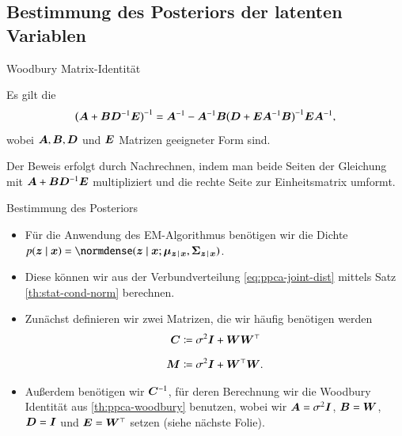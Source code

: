 \subsection{Bestimmung des Posteriors der latenten Variablen}

\begin{frame}{Woodbury Matrix-Identität}{}
	\begin{mytheo}
		Es gilt die 
		\begin{equation*}
			\bigl( \bm{A} + \bm{B} \bm{D}^{-1} \bm{E} \bigr)^{-1}
				= \bm{A}^{-1} - \bm{A}^{-1} \bm{B} \bigl( \bm{D} + \bm{E} \bm{A}^{-1} \bm{B} \bigr)^{-1} \bm{E} \bm{A}^{-1},
		\end{equation*}
		wobei $\bm{A}, \bm{B}, \bm{D}$ und $\bm{E}$ Matrizen geeigneter Form sind.
	\end{mytheo}
	
	\begin{myproof}
		Der Beweis erfolgt durch Nachrechnen, indem man beide Seiten der Gleichung mit $\bm{A} + \bm{B} \bm{D}^{-1} \bm{E}$
		multipliziert und die rechte Seite zur Einheitsmatrix umformt.
	\end{myproof}
\end{frame}


\begin{frame}{Bestimmung des Posteriors}{}
	\begin{itemize}
		\item Für die Anwendung des EM-Algorithmus benötigen wir die Dichte
			$p(\bz \mid \bx) = \normdense(\bz \mid \bx; \bmu_{\bz\,\mid\,\bx}, \bSigma_{\bz\,\mid\,\bx})$.
		\item Diese können wir aus der Verbundverteilung \eqref{eq:ppca-joint-dist}
			mittels Satz \ref{th:stat-cond-norm} berechnen.
		\item Zunächst definieren wir zwei Matrizen, die wir häufig benötigen werden
		\begin{align}
		\label{eq:ppca-C}
			\bm{C}
				&\coloneqq \sigma^2 \bm{I} + \bm{W} \bm{W}^\top
		\\[2mm]
		\label{eq:ppca-M}
			\bm{M}
				&\coloneqq \sigma^2 \bm{I} + \bm{W}^\top \bm{W}.
		\end{align}
		\item Außerdem benötigen wir $\bm{C}^{-1}$, für deren Berechnung wir die Woodbury Identität aus \ref{th:ppca-woodbury}
			benutzen, wobei wir $\bm{A} = \sigma^2 \bm{I}$, $\bm{B} = \bm{W}$, $\bm{D} = \bm{I}$ und $\bm{E} = \bm{W}^\top$ setzen
			(siehe nächste Folie).
	\end{itemize}
\end{frame}


